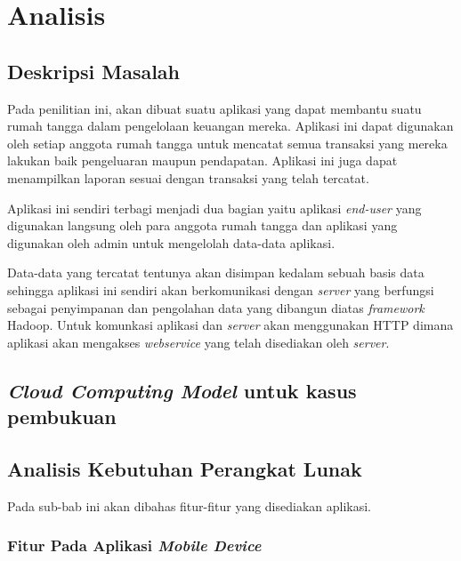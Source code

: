 \chapter{Analisis}
\label{chap:analisis}

\section{Deskripsi Masalah}
\label{sec:deskripsimasalah}

\hspace{0,5cm}Pada penilitian ini, akan dibuat suatu aplikasi yang dapat membantu suatu rumah tangga dalam pengelolaan keuangan mereka. Aplikasi ini dapat digunakan oleh setiap anggota rumah tangga untuk mencatat semua transaksi yang mereka lakukan baik pengeluaran maupun pendapatan. Aplikasi ini juga dapat menampilkan laporan sesuai dengan transaksi yang telah tercatat.

Aplikasi ini sendiri terbagi menjadi dua bagian yaitu aplikasi \textit{end-user} yang digunakan langsung oleh para anggota rumah tangga dan aplikasi yang digunakan oleh admin untuk mengelolah data-data aplikasi.

Data-data yang tercatat tentunya akan disimpan kedalam sebuah basis data sehingga aplikasi ini sendiri akan berkomunikasi dengan \textit{server} yang berfungsi sebagai penyimpanan dan pengolahan data yang dibangun diatas \textit{framework} Hadoop. Untuk komunkasi aplikasi dan \textit{server} akan menggunakan HTTP dimana aplikasi akan mengakses \textit{webservice} yang telah disediakan oleh \textit{server}.

\section{\textit{Cloud Computing Model} untuk kasus pembukuan}



\section{Analisis Kebutuhan Perangkat Lunak}

\hspace{0,5cm}Pada sub-bab ini akan dibahas fitur-fitur yang disediakan aplikasi.

\subsection{Fitur Pada Aplikasi \textit{Mobile Device}}


